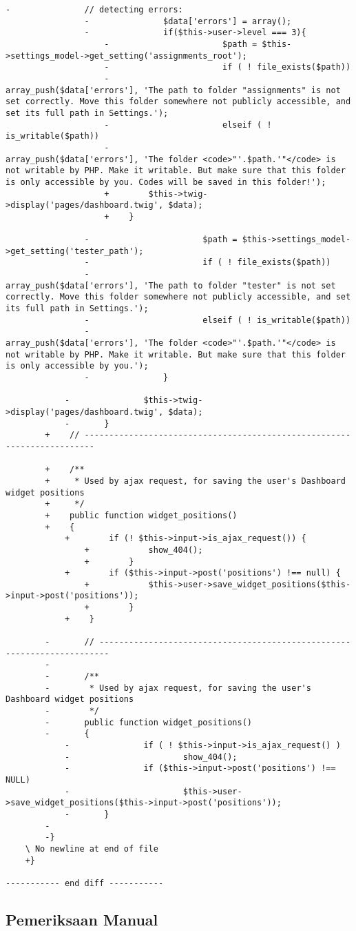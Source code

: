 \begin{lstlisting}[basicstyle=\ttfamily, frame=single,
	columns=fullflexible, keepspaces=true, breaklines=true, label=ck:31, caption=Contoh penggunaan PHP CS Fixer pada \textit{Dashboard.php}]
				-               // detecting errors:
				-               $data['errors'] = array();
				-               if($this->user->level === 3){
					-                       $path = $this->settings_model->get_setting('assignments_root');
					-                       if ( ! file_exists($path))
					-                               array_push($data['errors'], 'The path to folder "assignments" is not set correctly. Move this folder somewhere not publicly accessible, and set its full path in Settings.');
					-                       elseif ( ! is_writable($path))
					-                               array_push($data['errors'], 'The folder <code>"'.$path.'"</code> is not writable by PHP. Make it writable. But make sure that this folder is only accessible by you. Codes will be saved in this folder!');
					+        $this->twig->display('pages/dashboard.twig', $data);
					+    }
				
				-                       $path = $this->settings_model->get_setting('tester_path');
				-                       if ( ! file_exists($path))
				-                               array_push($data['errors'], 'The path to folder "tester" is not set correctly. Move this folder somewhere not publicly accessible, and set its full path in Settings.');
				-                       elseif ( ! is_writable($path))
				-                               array_push($data['errors'], 'The folder <code>"'.$path.'"</code> is not writable by PHP. Make it writable. But make sure that this folder is only accessible by you.');
				-               }
			
			-               $this->twig->display('pages/dashboard.twig', $data);
			-       }
		+    // ------------------------------------------------------------------------
		
		+    /**
		+     * Used by ajax request, for saving the user's Dashboard widget positions
		+     */
		+    public function widget_positions()
		+    {
			+        if (! $this->input->is_ajax_request()) {
				+            show_404();
				+        }
			+        if ($this->input->post('positions') !== null) {
				+            $this->user->save_widget_positions($this->input->post('positions'));
				+        }
			+    }
		
		-       // ------------------------------------------------------------------------
		-
		-       /**
		-        * Used by ajax request, for saving the user's Dashboard widget positions
		-        */
		-       public function widget_positions()
		-       {
			-               if ( ! $this->input->is_ajax_request() )
			-                       show_404();
			-               if ($this->input->post('positions') !== NULL)
			-                       $this->user->save_widget_positions($this->input->post('positions'));
			-       }
		-
		-}
	\ No newline at end of file
	+}

----------- end diff -----------
\end{lstlisting}

\subsection{Pemeriksaan Manual}
\label{periksa_manual}